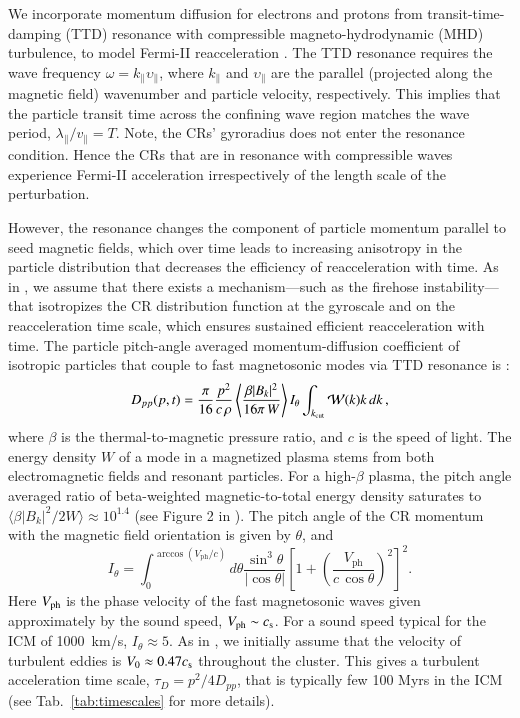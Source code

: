 \documentclass[useAMS,usenatbib]{mn2e}
\newcommand{\Vph}{V_\mathrm{ph}}
\begin{document}
We incorporate momentum diffusion for electrons and protons from
transit-time-damping (TTD) resonance with compressible
magneto-hydrodynamic (MHD) turbulence, to model Fermi-II
reacceleration \citep{brunetti07,brunetti11}. The TTD resonance
requires the wave frequency $\omega=k_\parallel\upsilon_\parallel$,
where $k_\parallel$ and $\upsilon_\parallel$ are the parallel
(projected along the magnetic field) wavenumber and particle velocity,
respectively. This implies that the particle transit time across the
confining wave region matches the wave period,
$\lambda_{\parallel}/v_{\parallel}=T$. Note, the CRs' gyroradius does
not enter the resonance condition. Hence the CRs that are in resonance
with compressible waves experience Fermi-II acceleration
irrespectively of the length scale of the perturbation.

However, the resonance changes the component of particle momentum
parallel to seed magnetic fields, which over time leads to increasing
anisotropy in the particle distribution that decreases the efficiency
of reacceleration with time. As in \citet{brunetti11}, we assume that
there exists a mechanism---such as the firehose instability---that
isotropizes the CR distribution function at the gyroscale and on the
reacceleration time scale, which ensures sustained efficient
reacceleration with time. The particle pitch-angle averaged
momentum-diffusion coefficient of isotropic particles that couple to
fast magnetosonic modes via TTD resonance is \citep[][ Eqn. 47]{brunetti07}:
\begin{eqnarray}
  D_{pp}(p,t) = \frac{\pi}{16} \frac{p^2}{c\,\rho}
  \left\langle\frac{\beta |B_k|^2}{16 \pi \,W}\right\rangle
  I_\theta
  \int_{k_{\mathrm{cut}}}\mathcal{W}(k)k\,d k\,,
\label{eq:dpp}
\end{eqnarray}
where $\beta$ is the thermal-to-magnetic pressure ratio, and $c$
is the speed of light. The energy density $W$ of a mode in a
magnetized plasma stems from both electromagnetic fields and resonant
particles. For a high-$\beta$ plasma, the pitch angle averaged ratio of
beta-weighted magnetic-to-total energy density saturates to $\langle\beta
|B_k|^2/2W\rangle\approx 10^{1.4}$ (see Figure 2 in
\citealt{brunetti07}). The pitch angle of the CR momentum with the
magnetic field orientation is given by $\theta$, and
\begin{equation}
  \label{eq:I_theta}
  I_\theta=\int_0^{\arccos(\Vph/c)} d\theta {\frac{ \sin^3 \theta }{
    |\cos \theta | }}
\left[1+\left(\frac{\Vph}{c\,\cos{\theta}}\right)^2\right]^2.
\end{equation}
Here $V_{\mathrm{ph}}$ is the phase velocity of the fast magnetosonic waves
given approximately by the sound speed, $\Vph \sim c_\rmn{s}$. For a
sound speed typical for the ICM of 1000~km/s, $I_\theta\approx5$. As
in \cite{brunetti07}, we initially assume that the velocity of
turbulent eddies is $V_0\approx 0.47 c_{\mathrm{s}}$ throughout the
cluster. This gives a turbulent acceleration time scale, $\tau_{D} =
p^2/4D_{pp}$, that is typically few 100 Myrs in the ICM (see
Tab.~\ref{tab:timescales} for more details).
\end{document}
